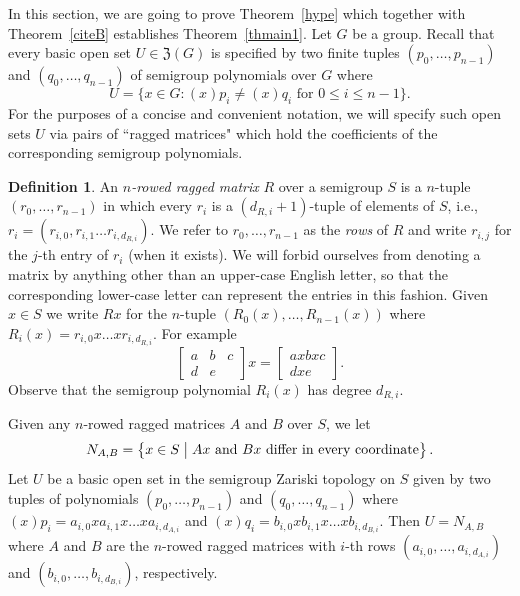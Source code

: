 \documentclass[11pt]{amsart}
\makeatletter
\theoremstyle{definition}
\newtheorem{definition}[theorem]{Definition}
\newcommand{\set}[2]{\{#1:#2\}}
\newcommand{\makeset}[2]{\left\lbrace #1 \;\middle|\;
 \begin{tabular}{@{}l@{}}
   #2
  \end{tabular}
  \right\rbrace}
\makeatother
\begin{document}
In this section, we are going to prove Theorem~\ref{hype} which together with Theorem~\ref{citeB} establishes Theorem~\ref{thmain1}.  Let $G$ be a group.
Recall that every basic open set $U\in \mathfrak{Z}(G)$ is specified by two finite tuples $(p_0, \dots, p_{n-1})$ and $(q_0, \dots, q_{n-1})$ of semigroup polynomials over $G$ where 
$$U=\set{x \in G}{(x)p_i\neq (x)q_i \text{ for } 0\leq i \leq n-1}.$$
For the purposes of a concise and convenient notation, we will specify such open sets $U$ via pairs of ``ragged matrices" which hold the coefficients of the corresponding semigroup polynomials. 
\begin{definition}
    An {\em $n$-rowed ragged matrix} \(R\) over a semigroup \(S\) is a $n$-tuple $(r_0, \dots, r_{n-1})$ in which every $r_i$ is a $(d_{R,i}+1)$-tuple of elements of $S$, i.e., $r_i =(r_{i,0}, r_{i,1}\ldots r_{i,d_{R,i}})$. We refer to $r_0, \dots,r_{n-1}$ as the {\em rows} of $R$ and write $r_{i,j}$ for the $j$-th entry of $r_i$ (when it exists).
    We will forbid ourselves from denoting a matrix by anything other than an upper-case English letter, so that the corresponding lower-case letter can represent the entries in this fashion.
    Given $x\in S$ we write $Rx$ for the $n$-tuple $(R_0(x), \dots, R_{n-1}(x))$ where
\(R_i(x)= r_{i,0}x\ldots xr_{i, d_{R, i}}.\)
For example
\[\begin{bmatrix}
    a & b & c\\
     d & e &
\end{bmatrix}x=\begin{bmatrix}
    a x b x c\\
    d x e 
\end{bmatrix}.\]
Observe that the semigroup polynomial $R_i(x)$ has degree $d_{R,i}$.
\end{definition}
Given any $n$-rowed ragged matrices $A$ and $B$ over $S$, we let
\[N_{A,B}=\makeset{x\in S}{\(Ax\) and \(Bx\) differ in every coordinate}.\]
Let $U$ be a basic open set in the semigroup Zariski topology on $S$ given by two tuples of polynomials $(p_0, \dots, p_{n-1})$ and $(q_0, \dots, q_{n-1})$ where $(x)p_i=a_{i,0}xa_{i,1}x\dots xa_{i,d_{A,i}}$ and $(x)q_i=b_{i,0}xb_{i,1}x\dots xb_{i,d_{B,i}}$. Then $U=N_{A,B}$ where $A$ and $B$ are the $n$-rowed ragged matrices with $i$-th rows $(a_{i,0}, \dots, a_{i,d_{A,i}})$ and $(b_{i,0}, \dots, b_{i,d_{B,i}})$, respectively.
\end{document}
